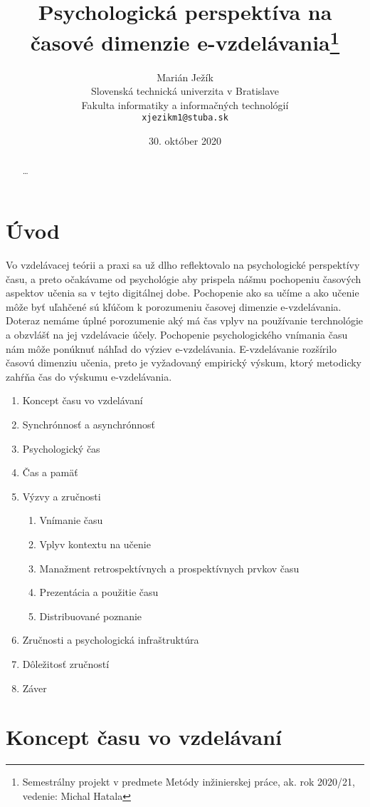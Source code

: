 \documentclass[10pt,twoside,slovak,a4paper]{article}
\title{Psychologická perspektíva na časové dimenzie e-vzdelávania\thanks{Semestrálny projekt v predmete Metódy inžinierskej práce, ak. rok 2020/21, vedenie: Michal Hatala}}
\author{Marián Ježík\\[2pt]
	{\small Slovenská technická univerzita v Bratislave}\\
	{\small Fakulta informatiky a informačných technológií}\\
	{\small \texttt{xjezikm1@stuba.sk}}
	}
\date{\small 30. október 2020}
\begin{document}
\maketitle
\begin{abstract}
\ldots%
\end{abstract}
\section{Úvod}

Vo vzdelávacej teórii a praxi sa už dlho reflektovalo na psychologické perspektívy času, a preto očakávame od psychológie aby prispela nášmu pochopeniu časových aspektov učenia sa v tejto digitálnej dobe. Pochopenie ako sa učíme a ako učenie môže byť uľahčené sú kľúčom k porozumeniu časovej dimenzie e-vzdelávania. Doteraz nemáme úplné porozumenie aký má čas vplyv na používanie terchnológie a obzvlášť na jej vzdelávacie účely. Pochopenie psychologického vnímania času nám môže ponúknuť náhľad do výziev e-vzdelávania. E-vzdelávanie rozšírilo časovú dimenziu učenia, preto je vyžadovaný empirický výskum, ktorý metodicky zahŕňa čas do výskumu e-vzdelávania.

\begin{enumerate}
\item Koncept času vo vzdelávaní
\item Synchrónnosť a asynchrónnosť%
\item Psychologický čas
\item Čas a pamäť
\item Výzvy a zručnosti
	\begin{enumerate}
	\item Vnímanie času
	\item Vplyv kontextu na učenie
	\item Manažment retrospektívnych a prospektívnych prvkov času
	\item Prezentácia a použitie času
	\item Distribuované poznanie
	\end{enumerate}
\item Zručnosti a psychologická infraštruktúra
\item Dôležitosť zručností
\item Záver
\end{enumerate}

\section{Koncept času vo vzdelávaní}
\end{document}
